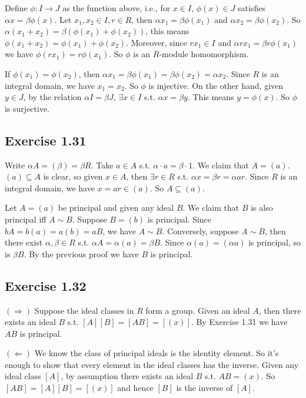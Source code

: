 \documentclass[../Marcus.tex]{subfiles}
\begin{document}
Define $\phi:I\to J$ as the function above, i.e., for $x\in I$, $\phi(x)\in J$ satisfies $\alpha x=\beta\phi(x)$. Let $x_1,x_2\in I,r\in R$, then $\alpha x_1=\beta\phi(x_1)$ and $\alpha x_2=\beta\phi(x_2)$. So $\alpha(x_1+x_2)=\beta(\phi(x_1)+\phi(x_2))$, this means $\phi(x_1+x_2)=\phi(x_1)+\phi(x_2)$. Moreover, since $rx_1\in I$ and $\alpha rx_1=\beta r\phi(x_1)$ we have $\phi(rx_1)=r\phi(x_1)$. So $\phi$ is an $R$-module homomorphism.

If $\phi(x_1)=\phi(x_2)$, then $\alpha x_1=\beta\phi(x_1)=\beta\phi(x_2)=\alpha x_2$. Since $R$ is an integral domain, we have $x_1=x_2$. So $\phi$ is injective. On the other hand, given $y\in J$, by the relation $\alpha I=\beta J$, $\exists x\in I$ s.t. $\alpha x=\beta y$. This means $y=\phi(x)$. So $\phi$ is surjective.

\subsection*{Exercise 1.31}

Write $\alpha A=(\beta)=\beta R$. Take $a\in A$ s.t. $\alpha\cdot a=\beta\cdot 1$. We claim that $A=(a)$. $(a)\subseteq A$ is clear, so given $x\in A$, then $\exists r\in R$ s.t. $\alpha x=\beta r=\alpha ar$. Since $R$ is an integral domain, we have $x=ar\in (a)$. So $A\subseteq (a)$. 

Let $A=(a)$ be principal and given any ideal $B$. We claim that $B$ is also principal iff $A\sim B$. Suppose $B=(b)$ is principal. Since $bA=b(a)=a(b)=aB$, we have $A\sim B$. Conversely, suppose $A\sim B$, then there exist $\alpha,\beta\in R$ s.t. $\alpha A=\alpha(a)=\beta B$. Since $\alpha(a)=(\alpha a)$ is principal, so is $\beta B$. By the previous proof we have $B$ is principal.

\subsection*{Exercise 1.32}

$(\Rightarrow)$ Suppose the ideal classes in $R$ form a group. Given an ideal $A$, then there exists an ideal $B$ s.t. $[A][B]=[AB]=[(x)]$. By Exercise 1.31 we have $AB$ is principal.

$(\Leftarrow)$ We know the class of principal ideals is the identity element. So it's enough to show that every element in the ideal classes has the inverse. Given any ideal class $[A]$, by assumption there exists an ideal $B$ s.t. $AB=(x)$. So $[AB]=[A][B]=[(x)]$ and hence $[B]$ is the inverse of $[A]$.
\end{document}
